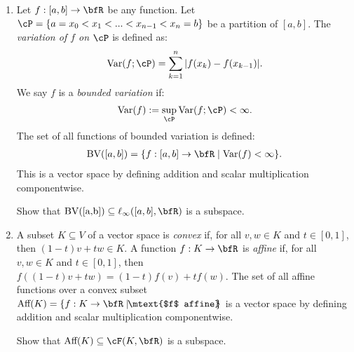 \begin{example}
\begin{enumerate}[label = (\arabic*)]
            \item Let $f:[a,b] \rightarrow \bfR$ be any function. Let $\cP = \{a = x_0 < x_1 < ... < x_{n-1} < x_n = b\}$ be a partition of $[a,b]$. The \textit{variation of $f$ on $\cP$} is defined as:
                \begin{equation*}
                \begin{split}
                    \text{Var}(f;\cP) = \sum_{k = 1}^n |f(x_k) - f(x_{k-1})|.
                \end{split}
                \end{equation*}
            We say $f$ is a \textit{bounded variation} if:
                \begin{equation*}
                \begin{split}
                    \text{Var}(f) := \sup_{\cP}\text{Var}(f;\cP) < \infty.
                \end{split}
                \end{equation*}
            The set of all functions of bounded variation is defined:
                \begin{equation*}
                \begin{split}
                    \text{BV}([a,b]) = \{f:[a,b] \rightarrow \bfR \mid \text{Var}(f) < \infty\}.
                \end{split}
                \end{equation*}
            This is a vector space by defining addition and scalar multiplication componentwise.
                \begin{exercise}\label{ex:bv-subspace}
                    Show that $\text{BV([a,b])} \subseteq \ell_\infty([a,b],\bfR)$ is a subspace.
                \end{exercise}
            
            \item A subset $K \subseteq V$ of a vector space is \textit{convex} if, for all $v,w \in K$ and $t \in [0,1]$, then $(1-t)v + tw \in K$. A function $f:K \rightarrow \bfR$ is \textit{affine} if, for all $v,w \in K$ and $t \in [0,1]$, then $f((1-t)v + tw) = (1-t)f(v) + tf(w)$. The set of all affine functions over a convex subset $\text{Aff}(K) = \{f:K \rightarrow \bfR \mid \hspace{-4pt}\mtext{$f$ affine}\hspace{-4pt}\}$ is a vector space by defining addition and scalar multiplication componentwise. 
                \begin{exercise}\label{ex:aff-subspace}
                    Show that $\text{Aff}(K) \subseteq \cF(K,\bfR)$ is a subspace.
                \end{exercise}


\end{enumerate}
\end{example}
